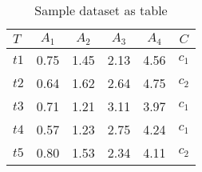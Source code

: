 \begin{table}[h]
\caption{Sample dataset as table}
\label{table:sec1_t1}
\centering
\begin{tabular}{lccccc}
	\toprule
	\textbf{$\mathit{T}$} & \textbf{$\mathit{A_1}$} & \textbf{$\mathit{A_2}$} & \textbf{$\mathit{A_3}$} & \textbf{$\mathit{A_4}$} & \textbf{$\mathit{C}$} \\
	\midrule
	$\mathit{t1}$ & 0.75 & 1.45 & 2.13 & 4.56 & $\mathit{c_1}$ \\
	$\mathit{t2}$ & 0.64 & 1.62 & 2.64 & 4.75 & $\mathit{c_2}$ \\
	$\mathit{t3}$ & 0.71 & 1.21 & 3.11 & 3.97 & $\mathit{c_1}$ \\
	$\mathit{t4}$ & 0.57 & 1.23 & 2.75 & 4.24 & $\mathit{c_1}$ \\
	$\mathit{t5}$ & 0.80 & 1.53 & 2.34 & 4.11 & $\mathit{c_2}$ \\
	\bottomrule
\end{tabular} 
\end{table}
